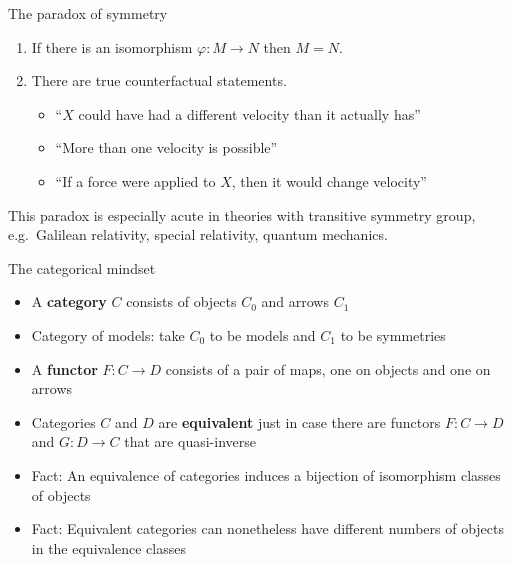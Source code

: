 \documentclass{beamer}
\begin{document}
\begin{frame}{The paradox of symmetry}


  \begin{enumerate}
  \item If there is an isomorphism $\varphi :M\to N$ then $M=N$.
  \item There are true counterfactual statements.
    \begin{itemize} \item ``$X$ could have had a different velocity
      than it actually has''
    \item ``More than one velocity is possible''
    \item ``If a force were applied to $X$, then it would change
      velocity''
   \end{itemize}   
  \end{enumerate}
  
  \bigskip This paradox is especially acute in theories with
  transitive symmetry group, e.g.\ Galilean relativity, special
  relativity, quantum mechanics.
  
\end{frame}

\begin{frame}{The categorical mindset}

  \begin{itemize}
  \item A \textbf{category} $C$ consists of objects $C_0$ and arrows $C_1$
  \item Category of models: take $C_0$ to be models and $C_1$ to be
    symmetries
  \item A \textbf{functor} $F:C\to D$ consists of a pair of maps, one
    on objects and one on arrows
  \item Categories $C$ and $D$ are \textbf{equivalent} just in case
    there are functors $F:C\to D$ and $G:D\to C$ that are
    quasi-inverse
  \item Fact: An equivalence of categories induces a bijection of
    isomorphism classes of objects 
  \item Fact: Equivalent categories can nonetheless have different
    numbers of objects in the equivalence classes
  \end{itemize}

\end{frame}
\end{document}

